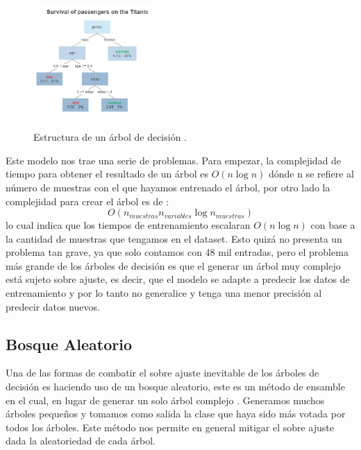 \documentclass[twocolumn]{article}
\begin{document}
\begin{figure}[!h]
\centering
\includegraphics[width=0.4\textwidth]{assets/Decision_Tree.jpg}
\caption{\label{fig:dt}Estructura de un árbol de decisión \cite{dtreewikip}.}
\end{figure}

Este modelo nos trae una serie de problemas. Para empezar, la complejidad  de tiempo
para obtener el resultado de un árbol es $O(n\log{n})$ \cite{sklearntree} 
dónde n se refiere al número de muestras con el que hayamos entrenado el árbol, 
por otro lado la complejidad  para crear el árbol es de \cite{sklearntree}:
\begin{equation}
  O(n_{muestras}n_{variables}\log{n_{muestras}})
\end{equation}
lo cual indica que los tiempos de entrenamiento escalaran $O(n\log{n})$ \cite{sklearntree} 
con base a la cantidad de muestras que tengamos en el dataset. Esto quizá no presenta 
un problema tan grave, ya que solo contamos con 48 mil entradas, pero el problema 
más grande de los árboles de decisión es que el generar un árbol muy complejo 
está sujeto sobre ajuste, es decir, que el modelo se adapte a predecir los datos 
de entrenamiento y por lo tanto no generalice y tenga una menor precisión al predecir 
datos nuevos.

\subsection{Bosque Aleatorio}
Una de las formas de combatir el sobre ajuste inevitable de los árboles de decisión
es haciendo uso de un bosque aleatorio, este es un método de ensamble en el cual,
en lugar de generar un solo árbol complejo \cite{rforestwikip}. Generamos muchos árboles pequeños y
tomamos como salida la clase que haya sido más votada por todos los árboles.
Este método nos permite en general mitigar el sobre ajuste dada la aleatoriedad de 
cada árbol.
\end{document}
